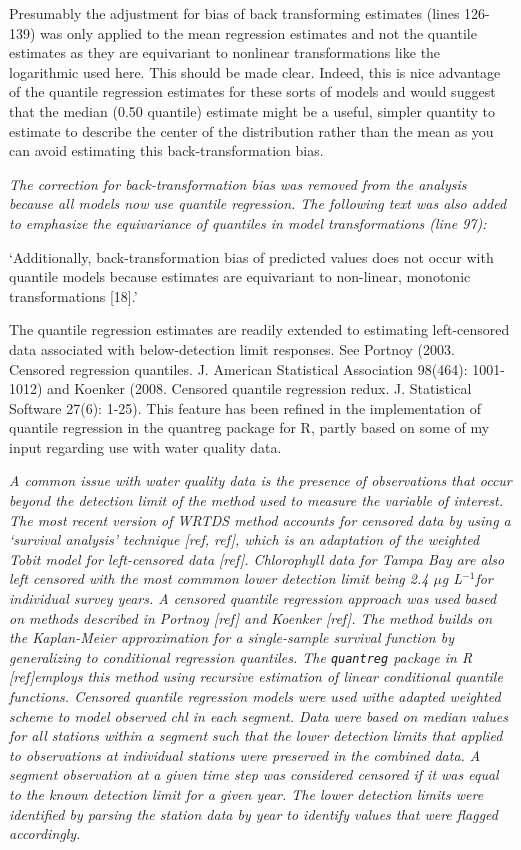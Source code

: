 \documentclass[letterpaper,12pt,oneside]{article}\usepackage[]{graphicx}\usepackage[]{color}
\newcommand{\mugl}{$\mu$g L$^{-1}$}
\begin{document}
Presumably the adjustment for bias of back transforming estimates (lines 126-139) was only applied to the mean regression estimates and not the quantile estimates as they are equivariant to nonlinear transformations like the logarithmic used here.  This should be made clear.  Indeed, this is nice advantage of the quantile regression estimates for these sorts of models and would suggest that the median (0.50 quantile) estimate might be a useful, simpler quantity to estimate to describe the center of the distribution rather than the mean as you can avoid estimating this back-transformation bias.

{\it The correction for back-transformation bias was removed from the analysis because all models now use quantile regression.  The following text was also added to emphasize the equivariance of quantiles in model transformations (line 97): 

`Additionally, back-transformation bias of predicted values does not occur with quantile models because estimates are equivariant to non-linear, monotonic transformations [18].'
}

The quantile regression estimates are readily extended to estimating left-censored data associated with below-detection limit responses.  See Portnoy (2003.  Censored regression quantiles. J. American Statistical Association 98(464): 1001-1012) and Koenker (2008.  Censored quantile regression redux.  J. Statistical Software 27(6): 1-25).  This feature has been refined in the implementation of quantile regression in the quantreg package for R, partly based on some of my input regarding use with water quality data. 

{\it A common issue with water quality data is the presence of observations that occur beyond the detection limit of the method used to measure the variable of interest.  The most recent version of \ac{WRTDS} method accounts for censored data by using a `survival analysis' technique [ref, ref], which is an adaptation of the weighted Tobit model for left-censored data [ref].  Chlorophyll data for Tampa Bay are also left censored with the most commmon lower detection limit being 2.4 \mugl for individual survey years.  A censored quantile regression approach was used based on methods described in Portnoy [ref] and Koenker [ref].  The method builds on the Kaplan-Meier approximation for a single-sample survival function by generalizing to conditional regression quantiles.  The \texttt{quantreg} package in R [ref]employs this method using recursive estimation of linear conditional quantile functions.  Censored quantile regression models were used withe adapted weighted scheme to model observed \ac{chl} in each segment.  Data were based on median values for all stations within a segment such that the lower detection limits that applied to observations at individual stations were preserved in the combined data.  A segment observation at a given time step was considered censored if it was equal to the known detection limit for a given year.  The lower detection limits were identified by parsing the station data by year to identify values that were flagged accordingly.}
\end{document}
